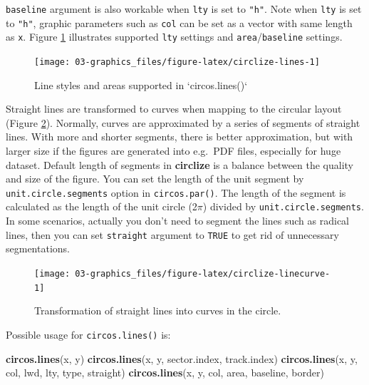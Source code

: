 \documentclass[]{book}
\newenvironment{Shaded}{\begin{snugshade}}{\end{snugshade}}
\newcommand{\KeywordTok}[1]{\textcolor[rgb]{0.13,0.29,0.53}{\textbf{#1}}}
\newcommand{\NormalTok}[1]{#1}
\theoremstyle{definition}
\theoremstyle{definition}
\theoremstyle{remark}
\begin{document}
\texttt{baseline} argument is also workable when \texttt{lty} is set to
\texttt{"h"}. Note when \texttt{lty} is set to \texttt{"h"}, graphic
parameters such as \texttt{col} can be set as a vector with same length
as \texttt{x}. Figure \ref{fig:circlize-lines} illustrates supported
\texttt{lty} settings and \texttt{area}/\texttt{baseline} settings.

\begin{figure}

{\centering \texttt{[image: 03-graphics\_files/figure-latex/circlize-lines-1]} 

}

\caption{Line styles and areas supported in `circos.lines()`}\label{fig:circlize-lines}
\end{figure}

Straight lines are transformed to curves when mapping to the circular
layout (Figure \ref{fig:circlize-linecurve}). Normally, curves are
approximated by a series of segments of straight lines. With more and
shorter segments, there is better approximation, but with larger size if
the figures are generated into e.g.~PDF files, especially for huge
dataset. Default length of segments in \textbf{circlize} is a balance
between the quality and size of the figure. You can set the length of
the unit segment by \texttt{unit.circle.segments} option in
\texttt{circos.par()}. The length of the segment is calculated as the
length of the unit circle (2\(\pi\)) divided by
\texttt{unit.circle.segments}. In some scenarios, actually you don't
need to segment the lines such as radical lines, then you can set
\texttt{straight} argument to \texttt{TRUE} to get rid of unnecessary
segmentations.

\begin{figure}

{\centering \texttt{[image: 03-graphics\_files/figure-latex/circlize-linecurve-1]} 

}

\caption{Transformation of straight lines into curves in the circle.}\label{fig:circlize-linecurve}
\end{figure}

Possible usage for \texttt{circos.lines()} is:

\begin{Shaded}
\begin{Highlighting}[]
\KeywordTok{circos.lines}\NormalTok{(x, y)}
\KeywordTok{circos.lines}\NormalTok{(x, y, sector.index, track.index)}
\KeywordTok{circos.lines}\NormalTok{(x, y, col, lwd, lty, type, straight)}
\KeywordTok{circos.lines}\NormalTok{(x, y, col, area, baseline, border)}
\end{Highlighting}
\end{Shaded}
\end{document}
